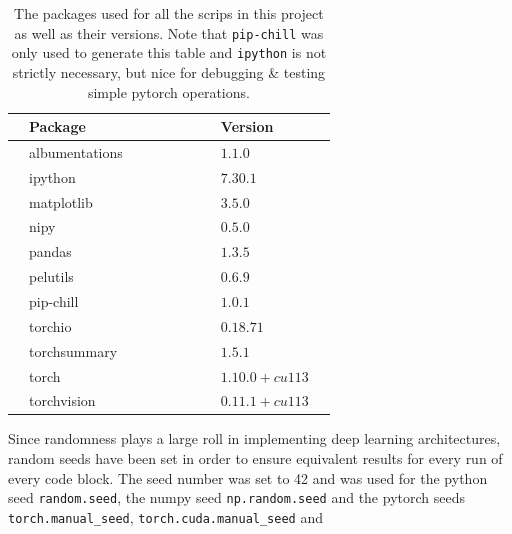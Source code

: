 \documentclass[11pt, fleqn, titlepage]{article}
\newcommand{\1}[1]{\mathds{1}\left[#1\right]}
\begin{document}
\begin{table}[H]
	\begin{center}
		\begin{tabular}{l l l l l l l l l l}
			\toprule			
			
			& \textbf{Package \cite{python_packages}}      & & & & & & & \textbf{Version}  & \\ \midrule
			& albumentations \cite{albumentations}         & & & & & & & $1.1.0$           & \\ 
			& ipython \cite{ipython}                       & & & & & & & $7.30.1$          & \\ 
			& matplotlib \cite{matplotlib}                 & & & & & & & $3.5.0$           & \\ 
			& nipy \cite{nipy}                             & & & & & & & $0.5.0$           & \\
			& pandas \cite{pandas}                         & & & & & & & $1.3.5$           & \\
			& pelutils \cite{pelutils}                     & & & & & & & $0.6.9$           & \\
			& pip-chill \cite{pip-chill}                   & & & & & & & $1.0.1$           & \\
			& torchio \cite{torchio}                       & & & & & & & $0.18.71$         & \\
			& torchsummary \cite{torchsummary}             & & & & & & & $1.5.1$           & \\
			& torch \cite{pytorch}                         & & & & & & & $1.10.0+cu113$    & \\
			& torchvision \cite{torchvision}               & & & & & & & $0.11.1+cu113$    & \\
			\bottomrule
		\end{tabular}
		\caption{The packages used for all the scrips in this project as well as their versions. Note that \texttt{pip-chill} was only used to generate this table and \texttt{ipython} is not strictly necessary, but nice for debugging \& testing simple pytorch operations.}
		\label{tab:packages}
	\end{center}
\end{table}
\noindent Since randomness plays a large roll in implementing deep learning architectures, random seeds have been set in order to ensure equivalent results for every run of every code block. The seed number was set to 42 and was used for the python seed \texttt{random.seed}, the numpy seed \texttt{np.random.seed} and the pytorch seeds \newline \texttt{torch.manual\_seed}, \texttt{torch.cuda.manual\_seed} and 
\end{document}
